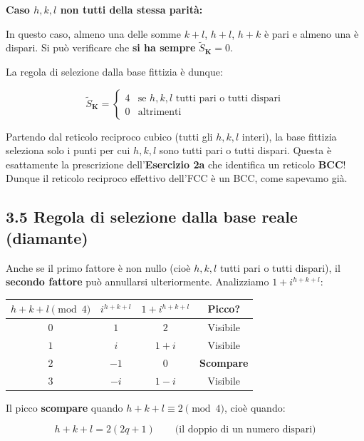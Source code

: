 \textbf{Caso $h, k, l$ non tutti della stessa parità:}

In questo caso, almeno una delle somme $k+l$, $h+l$, $h+k$ è pari e almeno una è dispari. Si può verificare che \textbf{si ha sempre} $\tilde{S}_{\mathbf{K}} = 0$.

La regola di selezione dalla base fittizia è dunque:

$$\tilde{S}_{\mathbf{K}} = \begin{cases} 4 & \text{se } h, k, l \text{ tutti pari o tutti dispari} \\ 0 & \text{altrimenti} \end{cases}$$

\begin{nota}
Partendo dal reticolo reciproco cubico (tutti gli $h, k, l$ interi), la base fittizia seleziona solo i punti per cui $h, k, l$ sono tutti pari o tutti dispari. Questa è esattamente la prescrizione dell'\textbf{Esercizio 2a} che identifica un reticolo \textbf{BCC}! Dunque il reticolo reciproco effettivo dell'FCC è un BCC, come sapevamo già.
\end{nota}

\subsection*{3.5 Regola di selezione dalla base reale (diamante)}

Anche se il primo fattore è non nullo (cioè $h, k, l$ tutti pari o tutti dispari), il \textbf{secondo fattore} può annullarsi ulteriormente. Analizziamo $1 + i^{h+k+l}$:

\begin{table}[h!]
\centering
\renewcommand{\arraystretch}{1.5}
\begin{tabular}{|c|c|c|c|}
\hline
\textbf{$h + k + l \pmod{4}$} & \textbf{$i^{h+k+l}$} & \textbf{$1 + i^{h+k+l}$} & \textbf{Picco?} \\ \hline
$0$ & $1$ & $2$ & Visibile \\ \hline
$1$ & $i$ & $1 + i$ & Visibile \\ \hline
$2$ & $-1$ & $0$ & \textbf{Scompare} \\ \hline
$3$ & $-i$ & $1 - i$ & Visibile \\ \hline
\end{tabular}
\end{table}

Il picco \textbf{scompare} quando $h + k + l \equiv 2 \pmod{4}$, cioè quando:

$$h + k + l = 2(2q + 1) \qquad \text{(il doppio di un numero dispari)}$$

